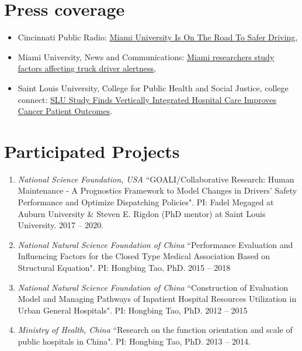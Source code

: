 \documentclass[11pt, a4paper]{article}
\newcommand{\years}[1]{\marginnote{\scriptsize #1}}
\begin{document}
	\section*{Press coverage}
	\begin{itemize}[leftmargin=0ex,itemsep=0ex, label={}]
	\item \years{2019} Cincinnati Public Radio: \href{https://www.wvxu.org/post/miami-university-road-safer-driving#stream/0}{Miami University Is On The Road To Safer Driving}, 
	
	\item \years{2019} Miami University, News and Communications: \href{https://miamioh.edu/news/top-stories/2019/06/fatigue-study.html}{Miami researchers study factors affecting truck driver alertness},
	
	\item \years{2019} Saint Louis University, College for Public Health and Social Justice, college connect:  \href{https://gallery.mailchimp.com/a3e4404ac622b2beb4b205f61/files/4cc71d2d-bdc4-4035-8ba6-b98ae42bedc3/SLU_Study_Finds_Vertically_Integrated_Hospital_Care_Improves_Cancer_Patient_Outcomes.pdf?utm_source=Unknown+List&utm_campaign=8d37abbd00-EMAIL_CAMPAIGN_2019_01_22_08_06&utm_medium=email&utm_term=0_-8d37abbd00-}{SLU Study Finds Vertically Integrated Hospital Care Improves Cancer Patient Outcomes}.
	\end{itemize}
	
	\section*{Participated Projects}
	\begin{enumerate}[leftmargin=0ex,itemsep=1ex]
	\item \emph{National Science Foundation, USA } ``GOALI/Collaborative Research: Human Maintenance - A Prognostics Framework to Model Changes in Drivers' Safety Performance and Optimize Dispatching Policies". PI: Fadel Megaged at Auburn University \& Steven E. Rigdon (PhD mentor) at Saint Louis University. 2017 -- 2020. 
	
	\item \emph{National Natural Science Foundation of China } ``Performance Evaluation and Influencing Factors for the Closed Type Medical Association Based on Structural Equation". PI: Hongbing Tao, PhD. 2015 -- 2018
	
	\item \emph{National Natural Science Foundation of China } ``Construction of Evaluation Model and Managing Pathways of Inpatient Hospital Resources Utilization in Urban General Hospitals". PI: Hongbing Tao, PhD. 2012 -- 2015
	
	\item \emph{Ministry of Health, China } ``Research on the function orientation and scale of public hospitals in China". PI: Hongbing Tao, PhD. 2013 -- 2014.
	\end{enumerate}
\end{document}
